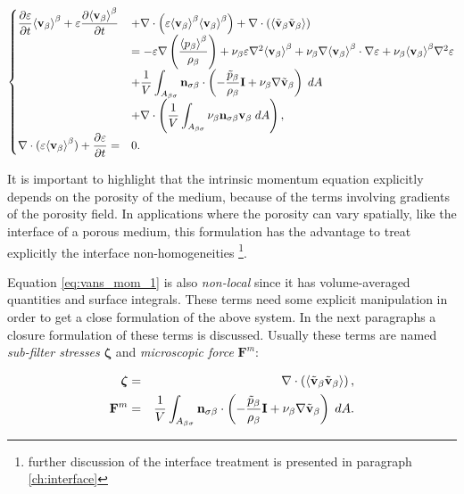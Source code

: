 \begin{eqnarray}
\begin{cases}
 \dfrac{\partial \varepsilon}{\partial t}{\left< \textbf{v}_{\beta} \right>}^{\beta} + \varepsilon \dfrac{\partial {\left< \textbf{v}_{\beta}\right>}^{\beta}}{\partial t} &+ \nabla \cdot \left(\varepsilon {\left< \textbf{v}_{\beta}\right>}^{\beta}{\left< \textbf{v}_{\beta} \right>}^{\beta}\right)   + \nabla \cdot \left({\left< \tilde{\textbf{v}}_{\beta} \tilde{\textbf{v}}_{\beta} \right>}\right)   \\
&= -\varepsilon \nabla \left(\dfrac{{\left< p_{\beta} \right>}^{\beta}}{\rho_{\beta}}\right) + \nu_{\beta} \varepsilon \nabla^2 {\left< \textbf{v}_{\beta} \right>}^{\beta} +  \nu_{\beta}  \nabla {\left< \textbf{v}_{\beta}\right>}^{\beta} \cdot \nabla \varepsilon + \nu_{\beta} {\left< \textbf{v}_{\beta} \right>}^{\beta} \nabla^2 \varepsilon  \\
&+ \dfrac{1}{V} \displaystyle\int_{A_{\beta \sigma}} \mathbf{n}_{\sigma \beta} \cdot  \left(-\dfrac{\tilde{p}_{\beta}}{\rho_{\beta}} \mathbf{I}  + \nu_{\beta} \nabla \tilde{\textbf{v}}_{\beta} \right) \;dA \\
& + \nabla \cdot \left( \dfrac{1}{V} \displaystyle\int_{A_{\beta \sigma}}  \nu_{\beta} \mathbf{n}_{\sigma \beta} \textbf{v}_{\beta}  \;dA \right), \\
\nabla \cdot (\varepsilon{\left< \textbf{v}_{\beta}\right>}^{\beta} ) + \dfrac{\partial \varepsilon}{\partial t} = &0.
\end{cases}
\label{eq:vans_mom_1}
\end{eqnarray}


It is important to highlight that the intrinsic momentum equation explicitly depends on the porosity of the medium, because of the terms involving gradients of the porosity field.
In applications where the porosity can vary spatially, like the interface of a porous medium, this formulation has the advantage to treat explicitly the interface non-homogeneities \footnote{further discussion of the interface treatment is presented in paragraph \ref{ch:interface}}.


Equation \eqref{eq:vans_mom_1} is also \textit{non-local} since it has volume-averaged quantities and surface integrals.
These terms need some explicit manipulation in order to get a close formulation of the above system.
In the next paragraphs a closure formulation of these terms is discussed. Usually these terms are named \textit{sub-filter stresses} $\boldsymbol{\zeta}$ and \textit{microscopic force} $\mathbf{F}^m$:

\begin{eqnarray}
\boldsymbol{\zeta}&=& \nabla \cdot \left({\left< \tilde{\textbf{v}}_{\beta} \tilde{\textbf{v}}_{\beta} \right>}\right), \nonumber \\
\mathbf{F}^m &=&  \dfrac{1}{V} \int_{A_{\beta \sigma}} \mathbf{n}_{\sigma \beta} \cdot \left(-\dfrac{\tilde{p}_{\beta}}{\rho_{\beta}} \mathbf{I}  + \nu_{\beta} \nabla \tilde{\textbf{v}}_{\beta} \right) \;dA. \nonumber
\end{eqnarray}

